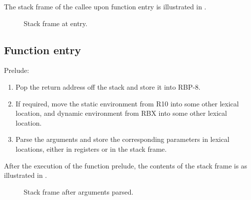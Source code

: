 The stack frame of the callee upon function entry is illustrated in
.

\begin{figure}
\begin{center}
\end{center}
\caption{\label{fig-x86-64-alternative-stack-frame-at-entry}
Stack frame at entry.}
\end{figure}

\subsection{Function entry}

Prelude:

\begin{enumerate}
\item Pop the return address off the stack and store it into RBP-8.
\item If required, move the static environment from R10 into some
  other lexical location, and dynamic environment from RBX into some
  other lexical location.
\item Parse the arguments and store the corresponding parameters in
  lexical locations, either in registers or in the stack frame.
\end{enumerate}

After the execution of the function prelude, the contents of the stack
frame is as illustrated in
.

\begin{figure}
\begin{center}
\end{center}
\caption{\label{fig-x86-64-alternative-stack-frame-after-arguments-parsed}
Stack frame after arguments parsed.}
\end{figure}

